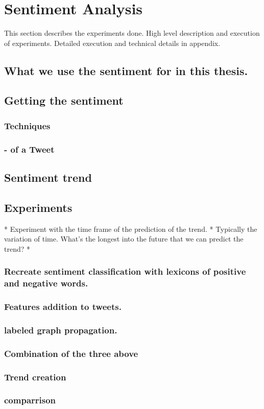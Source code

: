 
\section{Sentiment Analysis}
This section describes the experiments done. High level description and
execution of experiments. Detailed execution and technical details in appendix. 

\subsection{What we use the sentiment for in this thesis.}
\subsection{Getting the sentiment}
\subsubsection{Techniques}
\subsubsection{- of a Tweet}
\subsection{Sentiment trend}
\subsection{Experiments}

* Experiment with the time frame of the prediction of the trend. 
	* Typically the variation of time. What's the longest into the future that
we can predict the trend?
* 

\subsubsection{Recreate sentiment classification with lexicons of positive and
negative words.}
\subsubsection{Features addition to tweets.}
\subsubsection{labeled graph propagation.}
\subsubsection{Combination of the three above}
\subsubsection{Trend creation}
\subsubsection{comparrison}
